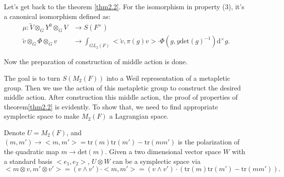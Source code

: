\documentclass[12pt,a4paper,english]{article}
\theoremstyle{plain}
\theoremstyle{definition}
\begin{document}
Let's get back to the theorem \ref{thm2.2}. For the isomorphism in property (3), it's a canonical isomorphism defined as:
\begin{align*}
    \mu: \tilde{V}\otimes_{G}Y^{0}\otimes_{G}V&\rightarrow S(F^{\times})\\
    \tilde{v}\otimes_{G}\Phi\otimes_{G}v&\rightarrow \int_{GL_{2}(F)}<\tilde{v},\pi(g)v>\cdot \Phi(g,y\text{det}(g)^{-1})\text{d}^{\times}g.
\end{align*}

Now the preparation of construction of middle action is done. 



The goal is to turn $S(M_{2}(F))$ into a Weil representation of a metapletic group. Then we use the action of this metapletic group to construct the desired middle action. After construction this middle action, the proof of properties of theorem\ref{thm2.2} is evidently. To show that, we need to find appropriate symplectic space to make $M_{2}(F)$ a Lagrangian space. 

Denote $U=M_{2}(F)$, and $
    (m, m')\rightarrow <m ,m'>=\text{tr}(m)\text{tr}(m')-\text{tr}(mm')$
is the polarization of the quadratic map $m\rightarrow \text{det}(m)$. Given a two dimensional vector space $W$ with a standard basis $<e_{1},e_{2}>$, $U\otimes W$ can be a symplectic space via 
\begin{equation*}
    <m\otimes v, m'\otimes v'>=(v\wedge v')\cdot <m, m'>=(v\wedge v')\cdot (\text{tr}(m)\text{tr}(m')-\text{tr}(mm')).
\end{equation*}
 
\end{document}
